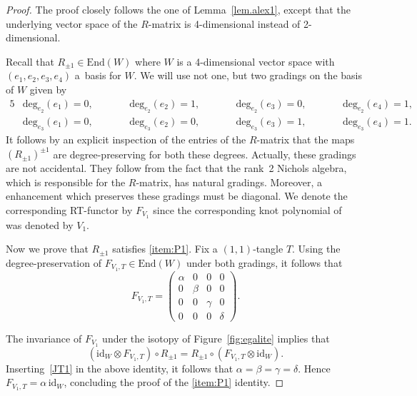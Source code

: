 \documentclass[10pt,a4paper]{amsart}
\numberwithin{equation}{section}
\theoremstyle{definition}
\begin{document}
\begin{proof}
The proof closely follows the one of Lemma~\ref{lem.alex1}, except that the
underlying vector space of the $R$-matrix is 4-dimensional instead of
2-dimensional.

Recall that $R_{\pm1} \in \mathrm{End}(W)$ where $W$ is a 4-dimensional vector space with
$(e_1,e_2,e_3,e_4)$ a~basis for $W$. We will use not one, but two
gradings on the basis of $W$ given by
\begin{alignat*}{5}
& \mathrm{deg}_{e_2}(e_1) = 0, \qquad&& \mathrm{deg}_{e_2}(e_2) = 1, \qquad&&
\mathrm{deg}_{e_2}(e_3) = 0, \qquad&& \mathrm{deg}_{e_2}(e_4) = 1,& \\
& \mathrm{deg}_{e_3}(e_1) = 0, \qquad&& \mathrm{deg}_{e_3}(e_2) = 0, \qquad&&
\mathrm{deg}_{e_3}(e_3) = 1, \qquad&& \mathrm{deg}_{e_3}(e_4) = 1 .&
\end{alignat*}
It follows by an explicit inspection of the entries of the $R$-matrix
that the maps $(R_{\pm 1})^{\pm 1}$ are degree-preserving for both these degrees.
Actually, these gradings are not accidental. They follow from the fact that the
rank~2 Nichols algebra, which is responsible for the $R$-matrix, has natural
gradings. Moreover, a enhancement which preserves these gradings must be diagonal.
We denote the corresponding RT-functor by $F_{V_1}$ since the corresponding knot
polynomial of~\cite{GK:multi} was denoted by $V_1$.

Now we prove that $R_{\pm 1}$ satisfies \eqref{item:P1}. Fix a $(1,1)$-tangle $T$.
Using the degree-preservation of $F_{V_1,T} \in \mathrm{End}(W)$ under both gradings,
it follows that
\begin{equation}
\label{JT1}
F_{V_1,T} = \begin{pmatrix}
\alpha & 0 & 0 & 0 \\
0 & \beta & 0 & 0 \\
0 & 0 & \gamma & 0 \\
0 & 0 & 0 & \delta
\end{pmatrix} .
\end{equation}

The invariance of $F_{V_1}$ under the isotopy of
Figure~\ref{fig:egalite} implies that
\begin{equation*}
(\mathrm{id}_W \otimes F_{V_1,T}) \circ R_{\pm 1} =
R_{\pm 1} \circ (F_{V_1,T} \otimes \mathrm{id}_W) .
\end{equation*}
Inserting~\eqref{JT1} in the above identity, it follows that
$\alpha = \beta = \gamma = \delta$. Hence
$F_{V_1,T} = \alpha\,\mathrm{id}_W$, concluding the proof of the \eqref{item:P1}
identity.


\end{proof}
\end{document}

